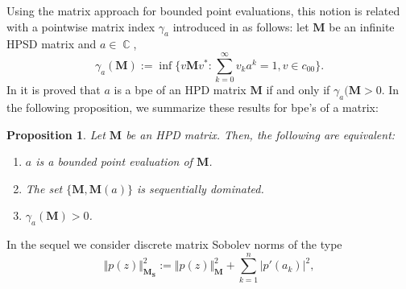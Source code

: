 \documentclass[12pt]{amsart}
\theoremstyle{definition}
\theoremstyle{plain}
\newtheorem{prop}{Proposition}
\theoremstyle{remark}
\DeclareMathOperator{\CC}{\mathbb C}
\begin{document}
\noindent Using the matrix approach for  bounded point evaluations, this notion is related with a pointwise matrix index $\gamma_{a}$ introduced in \cite{EGT5} as follows: let $\mathbf{M}$ be an infinite HPSD matrix and $a\in \CC$, 
$$
\gamma_{a}(\mathbf{M}):=\inf \{ v\mathbf{M}v^{*}: \sum_{k=0}^{\infty} v_ka^{k}=1, v\in c_{00}\}. 
$$
\noindent In \cite{EGT5} it is proved that $a$ is a bpe of an HPD matrix $\mathbf{M}$ if and only if $\gamma_{a}(\mathbf{M}>0$. 
 In the following proposition, we summarize these results for bpe's of a matrix: 


\begin{prop} Let $\mathbf{M}$ be an HPD matrix. Then, the following are equivalent:

\begin{enumerate}
\item $a$ is a bounded point evaluation of $\mathbf{M}$.



\smallskip 

\item The set $\{\mathbf{M},\mathbf{M}(a)\}$ is sequentially dominated. 
\item $\gamma_{a}(\mathbf{M})>0$.
\end{enumerate}
\end{prop}

%
 
%
\bigskip

\noindent In the sequel we consider discrete matrix Sobolev norms   of the type
\begin{equation}\label{sobPoint}
    \Vert p(z)\Vert^{2}_{\mathbf{M}_{\mathbf{S}}}:=\Vert p(z)\Vert^{2}_{\mathbf{M}}+ \sum_{k=1}^{n} \vert p'(a_k) \vert^{2},
\end{equation}
\end{document}
